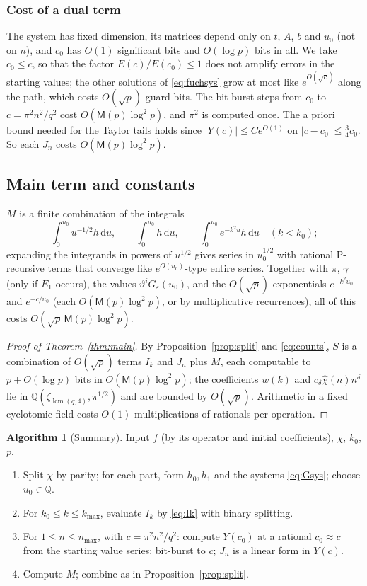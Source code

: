 \documentclass[11pt]{amsart}
\theoremstyle{definition}
\newtheorem{algorithm}[theorem]{Algorithm}
\theoremstyle{remark}
\newcommand{\dd}{\,\mathrm{d}}
\newcommand{\QQ}{\mathbb{Q}}
\newcommand{\Mul}{\mathsf{M}}
\begin{document}
\subsubsection{Cost of a dual term} The system has fixed dimension, its matrices depend only on $t$, $A$, $b$ and
$u_0$ (not on $n$), and $c_0$ has $O(1)$ significant bits and $O(\log p)$ bits in all. We take $c_0 \le c$, so that the
factor $E(c)/E(c_0) \le 1$ does not amplify errors in the starting values; the other solutions of
\eqref{eq:fuchsys} grow at most like $e^{O(\sqrt c)}$ along the path, which costs $O(\sqrt p)$ guard bits. The
bit-burst steps from $c_0$ to $c = \pi^2n^2/q^2$ cost $O(\Mul(p)\log^2p)$, and $\pi^2$ is computed once.
The a priori bound needed for the Taylor tails holds since $|Y(c)| \le C e^{O(1)}$ on
$|c - c_0| \le \frac34 c_0$. So each $J_n$ costs $O(\Mul(p)\log^2p)$.

\subsection{Main term and constants}
$M$ is a finite combination of the integrals
\[
  \int_0^{u_0} u^{-1/2} h\dd u, \qquad \int_0^{u_0} h\dd u, \qquad \int_0^{u_0}e^{-k^2u}h\dd u \quad (k < k_0);
\]
expanding the integrands in powers of $u^{1/2}$ gives series in $u_0^{1/2}$ with rational P-recursive terms that
converge like $e^{O(u_0)}$-type entire series. Together with $\pi$, $\gamma$ (only if $E_1$ occurs), the values
$\vartheta^iG_\varepsilon(u_0)$, and the $O(\sqrt p)$ exponentials $e^{-k^2u_0}$ and $e^{-c/u_0}$ (each
$O(\Mul(p)\log^2 p)$, or by multiplicative recurrences), all of this costs $O(\sqrt p\,\Mul(p)\log^2p)$.

\begin{proof}[Proof of Theorem~\ref{thm:main}]
By Proposition~\ref{prop:split} and \eqref{eq:counts}, $S$ is a combination of $O(\sqrt p)$ terms $I_k$
and $J_n$ plus $M$, each computable to $p + O(\log p)$ bits in $O(\Mul(p)\log^2p)$; the coefficients
$w(k)$ and $c_\delta\hat\chi(n)n^\delta$ lie in $\QQ(\zeta_{\operatorname{lcm}(q,4)}, \pi^{1/2})$ and are bounded by $O(\sqrt p)$.
Arithmetic in a fixed cyclotomic field costs $O(1)$ multiplications of rationals per operation.
\end{proof}

\begin{algorithm}[Summary]\label{alg:main}
Input $f$ (by its operator and initial coefficients), $\chi$, $k_0$, $p$.
\begin{enumerate}
\item Split $\chi$ by parity; for each part, form $h_0, h_1$ and the systems \eqref{eq:Gsys}; choose $u_0 \in \QQ$.
\item For $k_0 \le k \le k_{\max}$, evaluate $I_k$ by \eqref{eq:Ik} with binary splitting.
\item For $1 \le n \le n_{\max}$, with $c = \pi^2n^2/q^2$: compute $Y(c_0)$ at a rational $c_0 \approx c$ from
the starting value series; bit-burst to $c$; $J_n$ is a linear form in $Y(c)$.
\item Compute $M$; combine as in Proposition~\ref{prop:split}.
\end{enumerate}
\end{algorithm}
\end{document}
